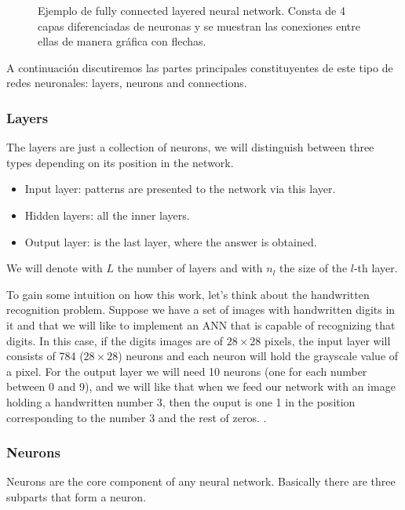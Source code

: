\begin{figure}[ht]
  \centering
  
  \caption[Fully Connected Neural Network topology]{Ejemplo de fully connected
    layered neural network. Consta de 4 capas diferenciadas de neuronas y se
    muestran las conexiones entre ellas de manera gráfica con flechas.}
  \label{fig:fully-conn-network}
\end{figure}

A continuación discutiremos las partes principales constituyentes de este tipo
de redes neuronales: layers, neurons and connections.

\subsubsection{Layers}
The layers are just a collection of neurons, we will distinguish between three
types depending on its position in the network.

\begin{itemize}
  \item Input layer: patterns are presented to the network via this layer.
  \item Hidden layers: all the inner layers.
  \item Output layer: is the last layer, where the answer is obtained.
\end{itemize}

We will denote with \(L\) the number of layers and with \(n_l\) the size of the
\(l\)-th layer.

To gain some intuition on how this work, let's think about the handwritten
recognition problem. Suppose we have a set of images with handwritten digits in
it and that we will like to implement an ANN that is capable of recognizing
that digits. In this case, if the digits images are of \(28 \times 28\) pixels,
the input layer will consists of 784 (\(28 \times 28\)) neurons and each neuron
will hold the grayscale value of a pixel. For the output layer we will need 10
neurons (one for each number between 0 and 9), and we will like that when we
feed our network with an image holding a handwritten number 3, then the ouput
is one 1 in the position corresponding to the number 3 and the rest of zeros.
.

\subsubsection{Neurons}
Neurons are the core component of any neural network. Basically there are three
subparts that form a neuron.

